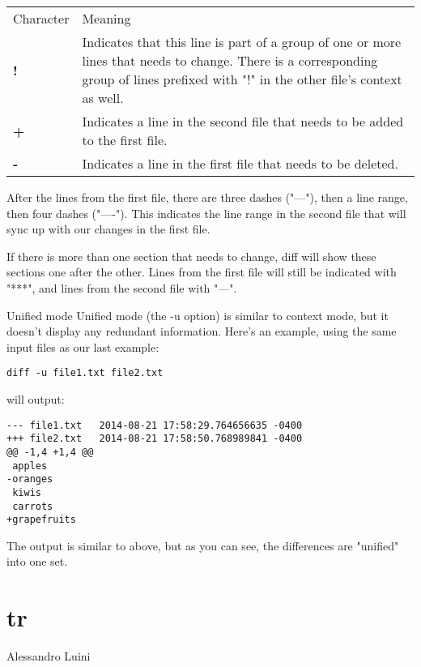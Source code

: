 \documentclass[hidelinks,12pt,a4paper,numbers=enddot]{scrartcl}
\begin{document}
\begin{table}[h]
\begin{tabular}{ll}
    Character &Meaning \\
    \textbf{!} &
            Indicates that this line is part of a group of one or more lines that
            needs to change. There is a corresponding group of lines prefixed with
            "!" in the other file's context as well.
         \\
    \textbf{+} &Indicates a line in the second file that needs to be added to the first file. \\
    \textbf{-} &Indicates a line in the first file that needs to be deleted. \\
\end{tabular}
\end{table}

After the lines from the first file, there are three dashes ("---"),
then a line range, then four dashes ("----"). This indicates the
line range in the second file that will sync up with our changes
in the first file.

If there is more than one section that needs to change, diff will
show these sections one after the other. Lines from the first file will
still be indicated with "***", and lines from the second file
with "---".

Unified mode
Unified mode (the -u option) is similar to context mode,
but it doesn't display any redundant information. Here's an example,
using the same input files as our last example:

\begin{verbatim}
diff -u file1.txt file2.txt
\end{verbatim}

will output:

\begin{verbatim}
--- file1.txt   2014-08-21 17:58:29.764656635 -0400
+++ file2.txt   2014-08-21 17:58:50.768989841 -0400
@@ -1,4 +1,4 @@
 apples
-oranges
 kiwis
 carrots
+grapefruits
\end{verbatim}

The output is similar to above, but as you can see, the differences are
"unified" into one set.

\section{tr}


\large Alessandro Luini \normalsize\\
\end{document}
